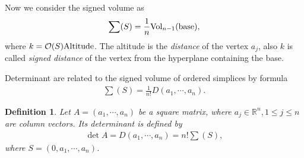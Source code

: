 \documentclass[10pt]{book}
\newtheorem{definition}{Definition}[chapter]
\theoremstyle{definition}
\numberwithin{equation}{chapter}
\begin{document}
Now we consider the signed volume as
\begin{align*}
    \sum (S) =\frac{1}{n}{\rm Vol}_{n-1}({\rm base}),
\end{align*}
where $k = \mathcal{O}(S) {\rm Altitude}$. The altitude is the \emph{distance} of the vertex $a_j$, also $k$ is called \emph{signed distance} of the vertex from the hyperplane containing the base. 

Determinant are related to the signed volume of ordered simplices by formula
\begin{align*}
    \sum (S) = \frac{1}{n!}D(a_1,\cdots,a_n).
\end{align*}

\medskip

\begin{definition}
Let $A = (a_1,\cdots, a_n)$ be a square matrix, where $a_j\in\mathbb{R}^n, 1\leq j\leq n$ are column vectors. Its determinant is defined by 
\begin{align*}
    \det A = D(a_1,\cdots,a_n) = n! \sum (S),
\end{align*}
where $S = (0,a_1,\cdots,a_n)$.
\end{definition}

\medskip
\end{document}

